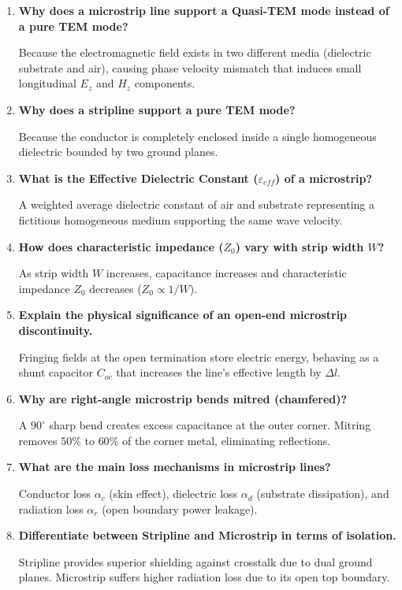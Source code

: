 \documentclass[10pt,a4paper]{article}
\newcommand{\Q}[1]{\textbf{#1}\par\vspace{2pt}}
\begin{document}
\begin{tcolorbox}[exambox, title={\textbf{Frequently Asked / Viva Questions}}]
  \begin{enumerate}[topsep=0pt, label=\textbf{Q\arabic*.}, itemsep=5pt]
    \item \Q{Why does a microstrip line support a Quasi-TEM mode instead of a pure TEM mode?}
    Because the electromagnetic field exists in two different media (dielectric substrate and air), causing phase velocity mismatch that induces small longitudinal $E_z$ and $H_z$ components.

    \item \Q{Why does a stripline support a pure TEM mode?}
    Because the conductor is completely enclosed inside a single homogeneous dielectric bounded by two ground planes.

    \item \Q{What is the Effective Dielectric Constant ($\varepsilon_{eff}$) of a microstrip?}
    A weighted average dielectric constant of air and substrate representing a fictitious homogeneous medium supporting the same wave velocity.

    \item \Q{How does characteristic impedance ($Z_0$) vary with strip width $W$?}
    As strip width $W$ increases, capacitance increases and characteristic impedance $Z_0$ decreases ($Z_0 \propto 1/W$).

    \item \Q{Explain the physical significance of an open-end microstrip discontinuity.}
    Fringing fields at the open termination store electric energy, behaving as a shunt capacitor $C_{oc}$ that increases the line's effective length by $\Delta l$.

    \item \Q{Why are right-angle microstrip bends mitred (chamfered)?}
    A $90^\circ$ sharp bend creates excess capacitance at the outer corner. Mitring removes $50\%$ to $60\%$ of the corner metal, eliminating reflections.

    \item \Q{What are the main loss mechanisms in microstrip lines?}
    Conductor loss $\alpha_c$ (skin effect), dielectric loss $\alpha_d$ (substrate dissipation), and radiation loss $\alpha_r$ (open boundary power leakage).

    \item \Q{Differentiate between Stripline and Microstrip in terms of isolation.}
    Stripline provides superior shielding against crosstalk due to dual ground planes. Microstrip suffers higher radiation loss due to its open top boundary.


\end{enumerate}
\end{tcolorbox}
\end{document}
